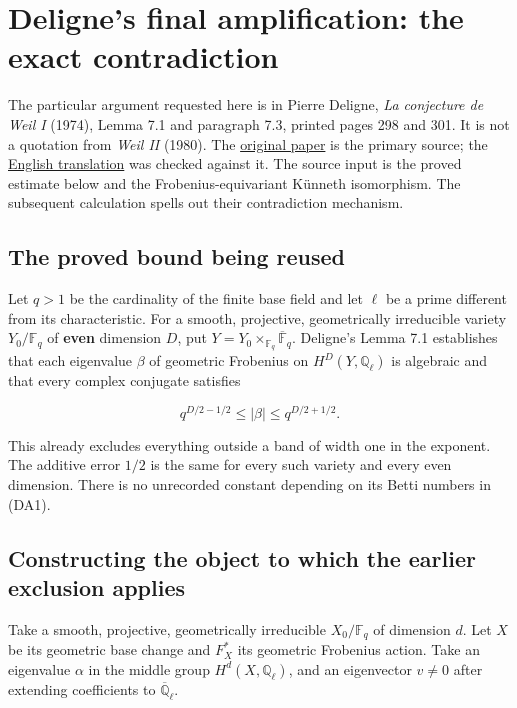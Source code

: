 \section{Deligne's final amplification: the exact
contradiction}\label{CFStage:delignes-final-amplification-the-exact-contradiction}

The particular argument requested here is in Pierre Deligne, \emph{La
conjecture de Weil I} (1974), Lemma 7.1 and paragraph 7.3, printed pages
298 and 301. It is not a quotation from \emph{Weil II} (1980). The
\href{https://www.numdam.org/item/PMIHES_1974__43__273_0.pdf}{original
paper} is the primary source; the
\href{https://arxiv.org/abs/1807.10810}{English translation} was checked
against it. The source input is the proved estimate below and the
Frobenius-equivariant Künneth isomorphism. The subsequent calculation
spells out their contradiction mechanism.

\subsection{The proved bound being
reused}\label{CFStage:the-proved-bound-being-reused}

Let \(q>1\) be the cardinality of the finite base field and let \(\ell\)
be a prime different from its characteristic. For a smooth, projective,
geometrically irreducible variety \(Y_0/\mathbb F_q\) of \textbf{even}
dimension \(D\), put
\(Y=Y_0\times_{\mathbb F_q}\overline{\mathbb F}_q\). Deligne's Lemma 7.1
establishes that each eigenvalue \(\beta\) of geometric Frobenius on
\(H^D(Y,\mathbb Q_\ell)\) is algebraic and that every complex conjugate
satisfies

\[q^{D/2-1/2}\le |\beta|\le q^{D/2+1/2}.\tag{DA1}\]

This already excludes everything outside a band of width one in the
exponent. The additive error \(1/2\) is the same for every such variety
and every even dimension. There is no unrecorded constant depending on
its Betti numbers in (DA1).

\subsection{Constructing the object to which the earlier exclusion
applies}\label{CFStage:constructing-the-object-to-which-the-earlier-exclusion-applies}

Take a smooth, projective, geometrically irreducible \(X_0/\mathbb F_q\)
of dimension \(d\). Let \(X\) be its geometric base change and \(F_X^*\)
its geometric Frobenius action. Take an eigenvalue \(\alpha\) in the
middle group \(H^d(X,\mathbb Q_\ell)\), and an eigenvector \(v\ne0\)
after extending coefficients to \(\overline{\mathbb Q}_\ell\).

